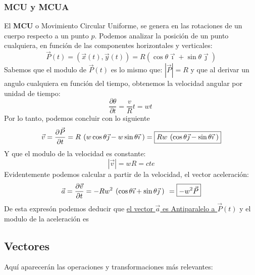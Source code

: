\subsubsection{MCU y MCUA}
 \par
El \textbf{MCU} o Movimiento Circular Uniforme, se genera en las rotaciones de un cuerpo respecto a un punto \(p\).
Podemos analizar la posición de un punto cualquiera, en función de las componentes horizontales y verticales:
\[
        \boxed{\vec{P}(t)=(\vec{x}(t),\vec{y}(t))=R(\cos{\theta}\vec{\imath} + \sin{\theta}\vec{\jmath})}
\]
Sabemos que el modulo de \(\vec{P}(t)\) es lo mismo que: \(\left | \vec{P} \right | = R\) y que al derivar un angulo cualquiera en función del tiempo, obtenemos la velocidad angular por unidad de tiempo: \[
        \frac{\partial \theta}{\partial t} = \frac{v}{R}t = wt\
\]
Por lo tanto, podemos concluir con lo siguiente
\[
        \vec{v} =\frac{\partial \vec{P}}{\partial t} =R \hspace{1.35mm} (w\cos{\theta}\vec{\jmath} - w\sin{\theta}\vec{\imath}\hspace{1mm})  = \boxed{Rw \hspace{1.35mm} (\cos{\theta}\vec{\jmath} - \sin{\theta}\vec{\imath}\hspace{1mm})}
\]
Y que el modulo de la velocidad es constante:
\[
        \left | \vec{v} \right | = wR = cte
\]
Evidentemente podemos calcular a partir de la velocidad, el vector aceleración:
\[
        \vec{a} =\frac{\partial \vec{v}}{\partial t} = -Rw^2 \hspace{1.35mm}(\cos{\theta}\vec{\imath} + \sin{\theta}\vec{\jmath}\hspace{1mm}) \hspace{1.35mm}= \boxed{-w^{2}\vec{P}}
\]
De esta expresón podemos deducir que \underline{el vector \(\vec{a}\) es Antiparalelo a \(\vec{P}(t)\)} y el modulo de la aceleración es 
\vspace{5cm}
\subsection{Vectores}

Aquí aparecerán las operaciones y transformaciones más relevantes: \par
\hspace{0.5cm}
